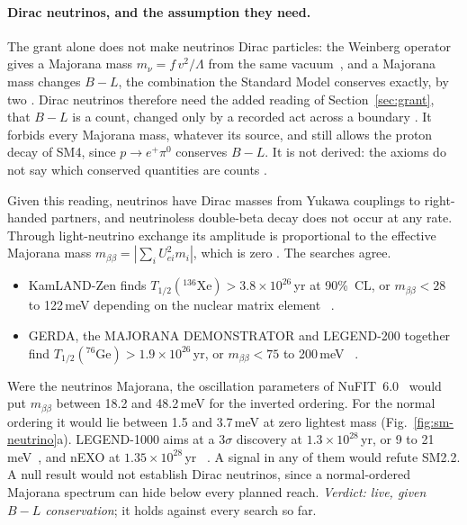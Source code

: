 \paragraph{Dirac neutrinos, and the assumption they need.} The grant alone does not make neutrinos Dirac particles: the Weinberg operator
gives a Majorana mass $m_\nu=f\,v^2/\Lambda$ from the same vacuum~\cite{weinberg1979,ma2009}, and a Majorana mass changes $B-L$, the
combination the Standard Model conserves exactly, by two \tagP. Dirac neutrinos therefore need the added reading of
Section~\ref{sec:grant}, that $B-L$ is a count, changed only by a recorded act across a boundary . It forbids every
Majorana mass, whatever its source, and still allows the proton decay of SM4, since $p\to e^+\pi^0$ conserves $B-L$. It is not derived:
the axioms do not say which conserved quantities are counts .

Given this reading, neutrinos have Dirac masses from Yukawa couplings to right-handed partners, and neutrinoless double-beta decay does not
occur at any rate. Through light-neutrino exchange its amplitude is proportional to the effective Majorana mass $m_{\beta\beta}=|\sum_iU_{ei}^2m_i|$,
which is zero \tagP. The searches agree.
\begin{itemize}[nosep]
\item KamLAND-Zen finds $T_{1/2}(^{136}\mathrm{Xe})>3.8\times10^{26}$\,yr at 90\%~CL, or $m_{\beta\beta}<28$ to 122\,meV depending on the nuclear
matrix element~\cite{kamlandzen2025} .
\item GERDA, the MAJORANA DEMONSTRATOR and LEGEND-200 together find $T_{1/2}(^{76}\mathrm{Ge})>1.9\times10^{26}$\,yr, or $m_{\beta\beta}<75$ to
200\,meV~\cite{legend2025} .
\end{itemize}
Were the neutrinos Majorana, the oscillation parameters of NuFIT~6.0~\cite{esteban2024} would put $m_{\beta\beta}$ between 18.2 and 48.2\,meV
for the inverted ordering. For the normal ordering it would lie between 1.5 and 3.7\,meV at zero lightest mass (Fig.~\ref{fig:sm-neutrino}a).
LEGEND-1000 aims at a $3\sigma$ discovery at $1.3\times10^{28}$\,yr, or 9 to 21\,meV~\cite{legend2021}, and nEXO at
$1.35\times10^{28}$\,yr~\cite{nexo2022} . A signal in any of them would refute SM2.2. A null result would not establish Dirac
neutrinos, since a normal-ordered Majorana spectrum can hide below every planned reach. \emph{Verdict: live, given $B-L$ conservation}; it holds
against every search so far.

